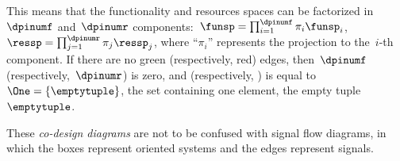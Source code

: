
This means that the functionality and resources spaces can be factorized in~$\dpinumf$ and~$\dpinumr$ components:~$\funsp=\prod_{i=1}^{\dpinumf}\pi_{i}\funsp_{i}$,~$\ressp=\prod_{j=1}^{\dpinumr}\pi_{j}\ressp_{j}$, where ``$\pi_{i}$'' represents the projection to the~$i$-th component.
If there are no green (respectively, red) edges, then~$\dpinumf$ (respectively,~$\dpinumr$) is zero, and \funsp (respectively, \ressp) is equal to~$\One=\{\emptytuple \}$, the set containing one element, the empty tuple~$\emptytuple$.

These \emph{co-design diagrams} are not to be confused with signal flow diagrams, in which the boxes represent oriented systems and the edges represent signals.


